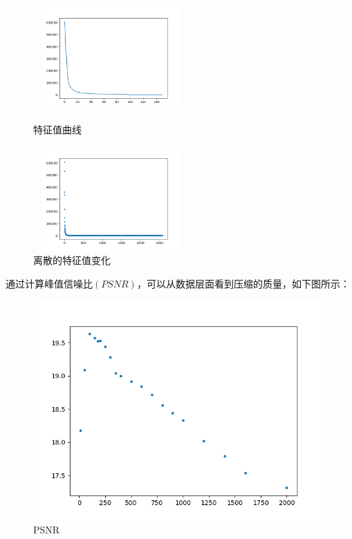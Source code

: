 \documentclass[UTF8]{ctexart}
\numberwithin{equation}{section}
\begin{document}
	\begin{figure}[htbp]
		\begin{minipage}[t]{0.45\linewidth}
			\centering
			\includegraphics[height=4cm,width=6cm]{Figure_3.png}
			\caption{特征值曲线}
			\label{f1}
		\end{minipage}%
		\begin{minipage}[t]{0.45\linewidth}
			\centering
			\includegraphics[height=4cm,width=6cm]{Figure_4.png}
			\caption{离散的特征值变化}
			\label{f2}
		\end{minipage}
	\end{figure}
	
	通过计算峰值信噪比$(PSNR)$，可以从数据层面看到压缩的质量，如下图所示：
	
	\begin{figure}[htbp]
		\centering
		\includegraphics[scale=0.6]{Figure_5.png}
		\caption{PSNR}
		\label{3}
	\end{figure}
	
\end{document}
